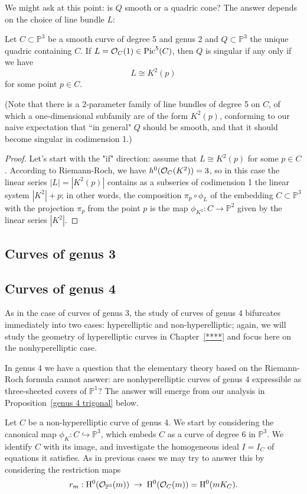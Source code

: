 \documentclass[12pt, leqno]{article}
\def\PP{{\mathbb P}}
\def\cO{{\cal O}}
\def\pic{{\rm Pic}}
\begin{document}
We might ask at this point: is $Q$ smooth or a quadric cone? The answer depends on the choice of line bundle $L$:

\begin{proposition}
Let $C \subset \PP^3$ be a smooth curve of degree 5 and genus 2 and $Q \subset \PP^3$ the unique quadric containing $C$. If $L = \cO_C(1) \in \pic^5(C)$, then $Q$ is singular if any only if we have
$$
L \cong K^2(p)
$$
for some point $p \in C$.
\end{proposition}

(Note that there is a 2-parameter family of line bundles of degree 5 on $C$, of which a one-dimensional subfamily are of the form $K^2(p)$, conforming to our naive expectation that ``in general" $Q$ should be smooth, and that it should become singular in codimension 1.)

\begin{proof}
Let's start with the "if" direction: assume that $L \cong K^2(p)$ for some $p \in C$. According to Riemann-Roch, we have $h^0(\cO_C(K^2)) = 3$, so in this case the linear series $|L| = |K^2(p)|$ contains as a subseries of codimension 1 the linear system $|K^2|+p$; in other words, the composition $\pi_p \circ \phi_L$ of the embedding $C \subset \PP^3$ with the projection $\pi_p$ from the point $p$ is the map $\phi_{K^2} : C \to \PP^2$ given by the linear series $|K^2|$.
\end{proof}

\subsection{Curves of genus 3}

\subsection{Curves of genus 4}

As in the case of curves of genus 3, the study of curves of genus 4 bifurcates immediately into two cases: hyperelliptic and non-hyperelliptic; again, we will study the geometry of hyperelliptic curves in Chapter~\ref{****} and focus here on the nonhyperelliptic case.

In genus 4 we have a question that the elementary theory based on the Riemann-Roch formula cannot answer: are nonhyperelliptic curves of genus 4 expressible as three-sheeted covers of $\PP^1$? The answer will emerge from our analysis in Proposition~\ref{genus 4 trigonal} below.

Let $C$ be a non-hyperelliptic curve of genus 4. We start by considering the canonical map $\phi_K : C \hookrightarrow \PP^3$, which embeds $C$ as a curve of degree 6 in $\PP^3$. We identify $C$ with its image, and investigate the homogeneous ideal $I = I_C$ of equations it satisfies. As in previous cases we may try to answer this by considering the restriction maps
$$
r_m : \HH^0(\cO_{\PP^3}(m)) \; \to \; \HH^0(\cO_{C}(m)) = \HH^0(mK_C).
$$
\end{document}
